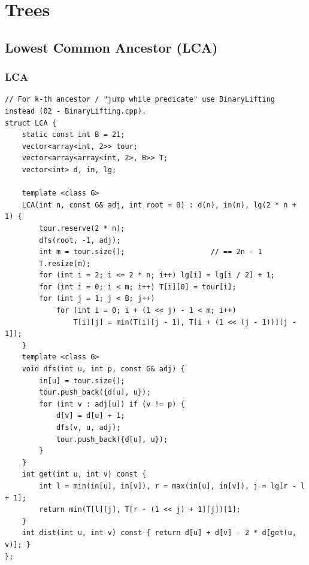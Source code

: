 \documentclass[9pt,a4paper,twocolumn]{extarticle}
\begin{document}
\section{Trees}

\subsection{Lowest Common Ancestor (LCA)}

\filbreak
\subsubsection{LCA}
\nopagebreak
\begin{lstlisting}
// For k-th ancestor / "jump while predicate" use BinaryLifting instead (02 - BinaryLifting.cpp).
struct LCA {
    static const int B = 21;
    vector<array<int, 2>> tour;
    vector<array<array<int, 2>, B>> T;
    vector<int> d, in, lg;

    template <class G>
    LCA(int n, const G& adj, int root = 0) : d(n), in(n), lg(2 * n + 1) {
        tour.reserve(2 * n);
        dfs(root, -1, adj);
        int m = tour.size();                    // == 2n - 1
        T.resize(m);
        for (int i = 2; i <= 2 * n; i++) lg[i] = lg[i / 2] + 1;
        for (int i = 0; i < m; i++) T[i][0] = tour[i];
        for (int j = 1; j < B; j++)
            for (int i = 0; i + (1 << j) - 1 < m; i++)
                T[i][j] = min(T[i][j - 1], T[i + (1 << (j - 1))][j - 1]);
    }
    template <class G>
    void dfs(int u, int p, const G& adj) {
        in[u] = tour.size();
        tour.push_back({d[u], u});
        for (int v : adj[u]) if (v != p) {
            d[v] = d[u] + 1;
            dfs(v, u, adj);
            tour.push_back({d[u], u});
        }
    }
    int get(int u, int v) const {
        int l = min(in[u], in[v]), r = max(in[u], in[v]), j = lg[r - l + 1];
        return min(T[l][j], T[r - (1 << j) + 1][j])[1];
    }
    int dist(int u, int v) const { return d[u] + d[v] - 2 * d[get(u, v)]; }
};
\end{lstlisting}

\filbreak
\end{document}
